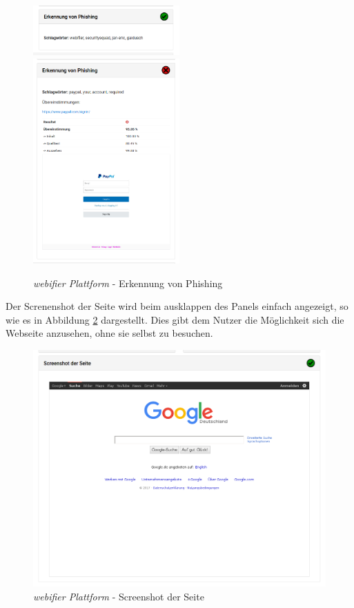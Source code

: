 \begin{figure}[H]
\centerline{%
\includegraphics[width=0.5\textwidth]{images/platform/phishing-clean}%
\includegraphics[width=0.5\textwidth]{images/platform/phishing-malicious}%
}%
\caption{\textit{webifier Plattform} - Erkennung von Phishing}
\label{fig:platform-result-phishingdetector}
\end{figure}

\newpage

Der Screnenshot der Seite wird beim ausklappen des Panels einfach angezeigt, so wie es in Abbildung \ref{fig:platform-result-screenshot} dargestellt. Dies gibt dem Nutzer die Möglichkeit sich die Webseite anzusehen, ohne sie selbst zu besuchen.

\begin{figure}[H]
  \centering
  \includegraphics[width=\textwidth]{images/platform/screenshot-clean}
  \caption{\textit{webifier Plattform} - Screenshot der Seite}
  \label{fig:platform-result-screenshot}
\end{figure}

